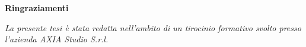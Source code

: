 \thispagestyle{empty}

\begin{center}
  {\bf \Huge Ringraziamenti}
\end{center}

\vspace{4cm}


\emph{
La presente tesi è stata redatta nell'ambito di un tirocinio formativo svolto presso l’azienda AXIA Studio S.r.l.
}
